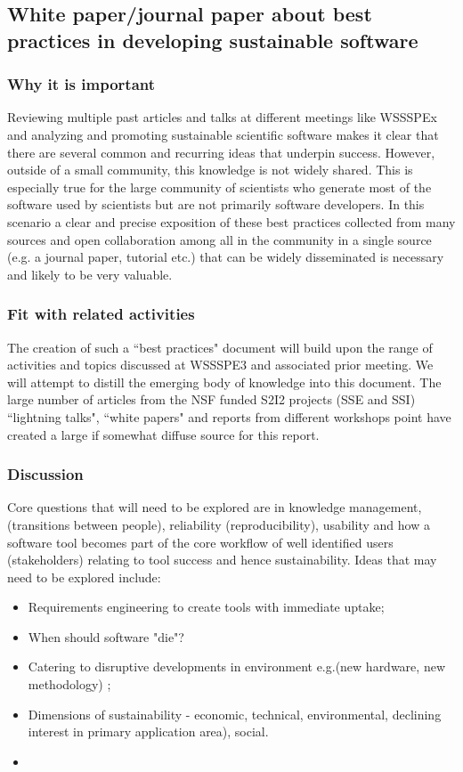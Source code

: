 \subsection{White paper/journal paper about best practices in developing sustainable software}
\label{sec:best-practices}

\subsubsection{Why it is important}
Reviewing multiple past articles and talks at different meetings like WSSSPEx\cite{WSSSPE papers, heroux paper, ...} and 
analyzing and promoting sustainable scientific software makes it clear that there 
are several common and recurring ideas that underpin success. However, outside of a small community, this knowledge is not widely
shared. This is  especially true for the large community of scientists who generate most of the software used by scientists but are not primarily software developers. In this
scenario a clear and precise exposition of these best practices collected from many sources and open collaboration among all in the community
in a single source (e.g. a journal paper, tutorial etc.)  that can be widely disseminated is necessary and likely to be very valuable.

\subsubsection{Fit with related activities}

The creation of such a ``best practices" document will build upon the range of activities and topics discussed at WSSSPE3 and associated prior meeting. We will attempt to
distill the emerging body of knowledge into this document. The large number of  articles from the NSF funded S2I2 projects (SSE and SSI) ``lightning talks", ``white papers"  and reports from different workshops point have created a large if somewhat diffuse source for this report.

\subsubsection{Discussion}

Core questions that will need to be explored are in knowledge management, 
(transitions between people), reliability (reproducibility), usability and how a software tool becomes part of the core workflow of well identified users (stakeholders)
relating to tool success and hence sustainability. Ideas 
that may need to be explored include:
\begin{itemize}
\item Requirements engineering to create tools with immediate uptake;
\item When should software "die"?
\item Catering to disruptive developments in environment e.g.(new hardware, new methodology) ;
\item Dimensions of sustainability - economic, technical, environmental, 
declining interest in primary application area), social.
\item 
\end{itemize}

